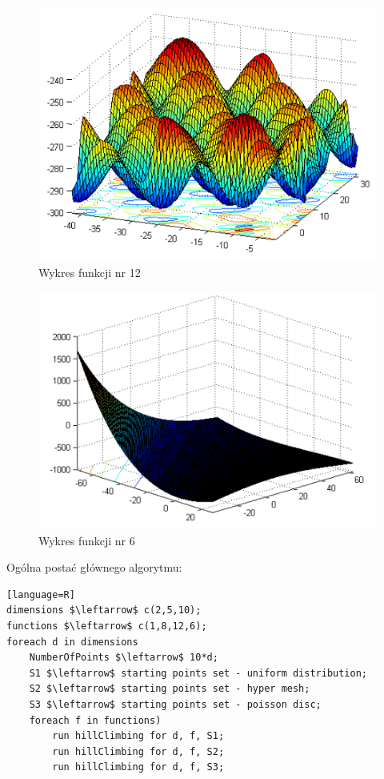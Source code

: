 \documentclass{article}
\begin{document}
\begin{figure}[H]
\centering
\includegraphics[scale=0.6]{12}
\caption{Wykres funkcji nr 12}
\end{figure}


\begin{figure}[H]
\centering
\includegraphics[scale=0.7]{6}
\caption{Wykres funkcji nr 6}
\end{figure}
\newpage
Ogólna postać głównego algorytmu:\\
\begin{lstlisting}[mathescape][language=R]
dimensions $\leftarrow$ c(2,5,10);
functions $\leftarrow$ c(1,8,12,6);
foreach d in dimensions
    NumberOfPoints $\leftarrow$ 10*d;
    S1 $\leftarrow$ starting points set - uniform distribution;
    S2 $\leftarrow$ starting points set - hyper mesh;
    S3 $\leftarrow$ starting points set - poisson disc;
    foreach f in functions)
        run hillClimbing for d, f, S1;
        run hillClimbing for d, f, S2;
        run hillClimbing for d, f, S3;
\end{lstlisting}
\end{document}
